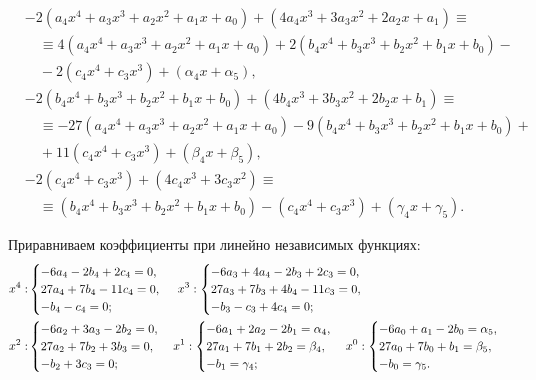 \documentclass[11pt]{article}
\begin{document}
{\[
\begin{aligned}
&-2(a_4x^4 + a_3x^3 + a_2x^2 + a_1x + a_0) + (4a_4x^3 + 3a_3x^2 + 2a_2x + a_1) \equiv \\
&\quad \equiv4(a_4x^4 + a_3x^3 + a_2x^2 + a_1x + a_0) + 2(b_4x^4 + b_3x^3 + b_2x^2 + b_1x + b_0)- \\
&\quad - 2(c_4x^4 + c_3x^3) + (\alpha_4x + \alpha_5), \\
%
&-2(b_4x^4 + b_3x^3 + b_2x^2 + b_1x + b_0) + (4b_4x^3 + 3b_3x^2 + 2b_2x + b_1) \equiv \\
&\quad \equiv-27(a_4x^4 + a_3x^3 + a_2x^2 + a_1x + a_0) - 9(b_4x^4 + b_3x^3 + b_2x^2 + b_1x + b_0)+ \\
&\quad + 11(c_4x^4 + c_3x^3) + (\beta_4x + \beta_5), \\
%
&-2(c_4x^4 + c_3x^3) + (4c_4x^3 + 3c_3x^2) \equiv \\
&\quad \equiv(b_4x^4 + b_3x^3 + b_2x^2 + b_1x + b_0) - (c_4x^4 + c_3x^3) + (\gamma_4x + \gamma_5).
\end{aligned}
\]

Приравниваем коэффициенты при линейно независимых функциях:
\[
\begin{aligned}
x^4: & \begin{cases}
-6a_4 - 2b_4 + 2c_4 = 0, \\
27a_4 + 7b_4 - 11c_4 = 0, \\
-b_4 - c_4 = 0;
\end{cases} \hspace{0.25em}
x^3: \begin{cases}
-6a_3 + 4a_4 - 2b_3 + 2c_3 = 0, \\
27a_3 + 7b_3 + 4b_4 - 11c_3 = 0, \\
-b_3 - c_3 + 4c_4 = 0;
\end{cases} \\
x^2: & \begin{cases}
-6a_2 + 3a_3 - 2b_2 = 0, \\
27a_2 + 7b_2 + 3b_3 = 0, \\
-b_2 + 3c_3 = 0;
\end{cases}
x^1: \begin{cases}
-6a_1 + 2a_2 - 2b_1 = \alpha_4, \\
27a_1 + 7b_1 + 2b_2 = \beta_4, \\
-b_1 = \gamma_4;
\end{cases}
x^0: \begin{cases}
-6a_0 + a_1 - 2b_0 = \alpha_5, \\
27a_0 + 7b_0 + b_1 = \beta_5, \\
-b_0 = \gamma_5.
\end{cases}
\end{aligned}
\]

}
\end{document}
